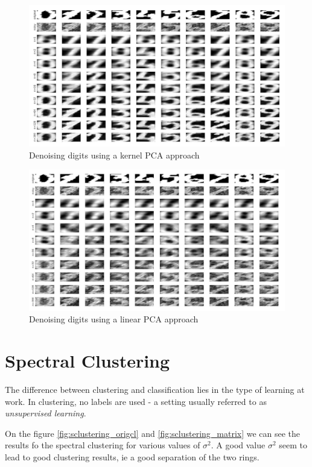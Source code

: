 \documentclass[11pt, a4paper]{article}
\begin{document}
\begin{figure}[H]
  \centering
  \includegraphics[scale=.30]{digitsn_kernelpca.jpg}
  \caption{Denoising digits using a kernel PCA approach}
  \label{fig:digitsn_kernelpca}
\end{figure}

\begin{figure}[H]
  \centering
  \includegraphics[scale=.30]{digitsn_linearpca.jpg}
  \caption{Denoising digits using a linear PCA approach}
  \label{fig:digitsn_linearpca}
\end{figure}

\section{Spectral Clustering}

The difference between clustering and classification lies in the type
of learning at work. In clustering, no labels are used - a setting
usually referred to as \emph{unsupervised learning}.

On the figure \ref{fig:sclustering_origcl} and
\ref{fig:sclustering_matrix} we can see the results fo the spectral
clustering for various values of $\sigma^2$. A good value $\sigma^2$
seem to lead to good clustering results, ie a good separation of the
two rings.
\end{document}
